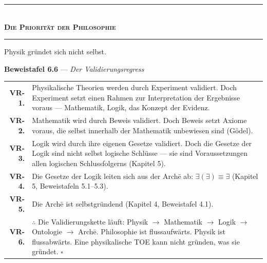 \documentclass[10pt, openany, oneside]{book}
\renewcommand{\normalsize}{\fontsize{10}{13}\selectfont}
\renewcommand{\footnotesize}{\fontsize{8.5}{11}\selectfont}
\begin{document}
\vspace{1.5em}


\begin{center}
    \rule{0.3\textwidth}{0.4pt}\\[0.5em]
    {\normalsize\bfseries\scshape Die Priorität der Philosophie}\\[0.3em]
    \rule{0.3\textwidth}{0.4pt}
\end{center}

\vspace{1em}

\noindent Physik gründet sich nicht selbst.

\vspace{0.5em}

\textbf{Beweistafel 6.6} --- \textit{Der Validierungsregress}

\vspace{0.5em}

{\footnotesize
\noindent\begin{tabular}{r p{}}
\textbf{VR-1.} & Physikalische Theorien werden durch Experiment validiert. Doch Experiment setzt einen Rahmen zur Interpretation der Ergebnisse voraus --- Mathematik, Logik, das Konzept der Evidenz. \\[0.3em]
\textbf{VR-2.} & Mathematik wird durch Beweis validiert. Doch Beweis setzt Axiome voraus, die selbst innerhalb der Mathematik unbewiesen sind (Gödel). \\[0.3em]
\textbf{VR-3.} & Logik wird durch ihre eigenen Gesetze validiert. Doch die Gesetze der Logik sind nicht selbst logische Schlüsse --- sie sind Voraussetzungen allen logischen Schlussfolgerns (Kapitel 5). \\[0.3em]
\textbf{VR-4.} & Die Gesetze der Logik leiten sich aus der Arch\={e} ab: $\exists(\exists) \equiv \exists$ (Kapitel 5, Beweistafeln 5.1--5.3). \\[0.3em]
\textbf{VR-5.} & Die Arch\={e} ist selbstgründend (Kapitel 4, Beweistafel 4.1). \\[0.3em]
\textbf{VR-6.} & $\therefore$ Die Validierungskette läuft: Physik $\to$ Mathematik $\to$ Logik $\to$ Ontologie $\to$ Arch\={e}. Philosophie ist flussaufwärts. Physik ist flussabwärts. Eine physikalische TOE kann nicht gründen, was sie gründet. $\square$ \\[0.3em]
\end{tabular}
}
\end{document}

